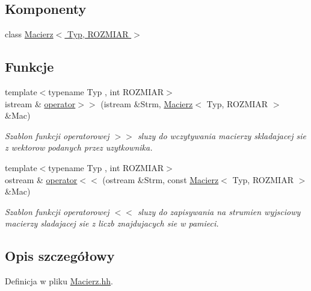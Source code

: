 \subsection*{Komponenty}
\begin{DoxyCompactItemize}
\item 
class \hyperlink{class_macierz}{Macierz$<$ Typ, ROZMIAR $>$}
\end{DoxyCompactItemize}
\subsection*{Funkcje}
\begin{DoxyCompactItemize}
\item 
{\footnotesize template$<$typename Typ , int ROZMIAR$>$ }\\istream \& \hyperlink{_macierz_8hh_a1c08e6a33bb216fa9634ec5dc037d2fa}{operator$>$$>$} (istream \&Strm, \hyperlink{class_macierz}{Macierz}$<$ Typ, ROZMIAR $>$ \&Mac)
\begin{DoxyCompactList}\small\item\em Szablon funkcji operatorowej $>$$>$ sluzy do wczytywania macierzy skladajacej sie z wektorow podanych przez uzytkownika. \item\end{DoxyCompactList}\item 
{\footnotesize template$<$typename Typ , int ROZMIAR$>$ }\\ostream \& \hyperlink{_macierz_8hh_a9e0ef06d4cb05883781442e8c612d2c1}{operator$<$$<$} (ostream \&Strm, const \hyperlink{class_macierz}{Macierz}$<$ Typ, ROZMIAR $>$ \&Mac)
\begin{DoxyCompactList}\small\item\em Szablon funkcji operatorowej $<$$<$ sluzy do zapisywania na strumien wyjsciowy macierzy sladajacej sie z liczb znajdujacych sie w pamieci. \item\end{DoxyCompactList}\end{DoxyCompactItemize}


\subsection{Opis szczegółowy}


Definicja w pliku \hyperlink{_macierz_8hh_source}{Macierz.hh}.



